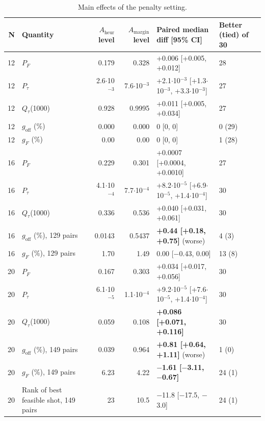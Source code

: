 \documentclass{ieeeaccess}
\begin{document}
\begin{table}[!t]
\centering
\scriptsize
\caption{Main effects of the penalty setting.}
\label{tab:IV}
\begin{tabular}{rp{}rrp{}p{}}
\toprule
N & Quantity & $A_{\mathrm{heur}}$ level & $A_{\mathrm{margin}}$ level & Paired median diff [95\% CI] & Better (tied) of 30 \\
\midrule
12 & $P_{F}$ & 0.179 & 0.328 & +0.006 [+0.005, +0.012] & 28 \\
12 & $P_{\tau}$ & 2.6$\cdot$10$^{-3}$ & 7.6$\cdot$10$^{-3}$ & +2.1$\cdot$10$^{-3}$ [+1.3$\cdot$10$^{-3}$, +3.3$\cdot$10$^{-3}$] & 27 \\
12 & $Q_{\tau}$(1000) & 0.928 & 0.9995 & +0.011 [+0.005, +0.034] & 27 \\
12 & $g_{\mathrm{off}}$ (\%) & 0.000 & 0.000 & 0 [0, 0] & 0 (29) \\
12 & $g_{F}$ (\%) & 0.00 & 0.00 & 0 [0, 0] & 1 (28) \\
16 & $P_{F}$ & 0.229 & 0.301 & +0.0007 [+0.0004, +0.0010] & 27 \\
16 & $P_{\tau}$ & 4.1$\cdot$10$^{-4}$ & 7.7$\cdot$10$^{-4}$ & +8.2$\cdot$10$^{-5}$ [+6.9$\cdot$10$^{-5}$, +1.4$\cdot$10$^{-4}$] & 30 \\
16 & $Q_{\tau}$(1000) & 0.336 & 0.536 & +0.040 [+0.031, +0.061] & 30 \\
16 & $g_{\mathrm{off}}$ (\%), 129 pairs & 0.0143 & 0.5437 & \textbf{+0.44 [+0.18, +0.75]} (worse) & 4 (3) \\
16 & $g_{F}$ (\%), 129 pairs & 1.70 & 1.49 & 0.00 [$-$0.43, 0.00] & 13 (8) \\
20 & $P_{F}$ & 0.167 & 0.303 & +0.034 [+0.017, +0.056] & 30 \\
20 & $P_{\tau}$ & 6.1$\cdot$10$^{-5}$ & 1.1$\cdot$10$^{-4}$ & +9.2$\cdot$10$^{-5}$ [+7.6$\cdot$10$^{-5}$, +1.4$\cdot$10$^{-4}$] & 30 \\
20 & $Q_{\tau}$(1000) & 0.059 & 0.108 & \textbf{+0.086 [+0.071, +0.116]} & 30 \\
20 & $g_{\mathrm{off}}$ (\%), 149 pairs & 0.039 & 0.964 & \textbf{+0.81 [+0.64, +1.11]} (worse) & 1 (0) \\
20 & $g_{F}$ (\%), 149 pairs & 6.23 & 4.22 & \textbf{$-$1.61 [$-$3.11, $-$0.67]} & 24 (1) \\
20 & Rank of best feasible shot, 149 pairs & 23 & 10.5 & $-$11.8 [$-$17.5, $-$3.0] & 24 (1) \\
\bottomrule
\end{tabular}
\end{table}
\end{document}

